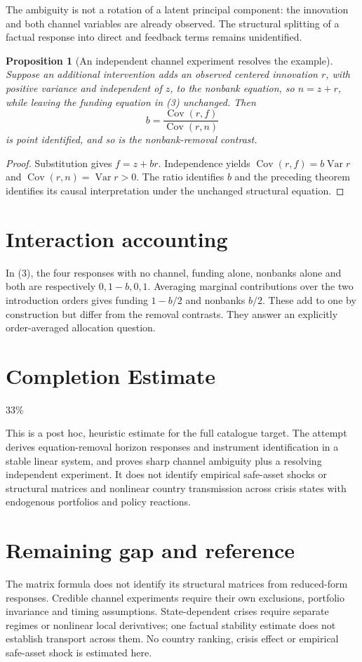 \documentclass[11pt,a4paper]{article}
\newtheorem{proposition}[theorem]{Proposition}
\theoremstyle{definition}
\theoremstyle{remark}
\DeclareMathOperator{\Var}{Var}
\DeclareMathOperator{\Cov}{Cov}
\begin{document}
The ambiguity is not a rotation of a latent principal component: the innovation and both channel variables are already observed. The structural splitting of a factual response into direct and feedback terms remains unidentified.

\begin{proposition}[An independent channel experiment resolves the example]
Suppose an additional intervention adds an observed centered innovation $r$, with positive variance and independent of $z$, to the nonbank equation, so $n=z+r$, while leaving the funding equation in (3) unchanged. Then
\[
 b=\frac{\Cov(r,f)}{\Cov(r,n)}
\]
is point identified, and so is the nonbank-removal contrast.
\end{proposition}
\begin{proof}
Substitution gives $f=z+br$. Independence yields $\Cov(r,f)=b\Var r$ and $\Cov(r,n)=\Var r>0$. The ratio identifies $b$ and the preceding theorem identifies its causal interpretation under the unchanged structural equation.
\end{proof}

\section{Interaction accounting}
In (3), the four responses with no channel, funding alone, nonbanks alone and both are respectively $0,1-b,0,1$. Averaging marginal contributions over the two introduction orders gives funding $1-b/2$ and nonbanks $b/2$. These add to one by construction but differ from the removal contrasts. They answer an explicitly order-averaged allocation question.

\section{Completion Estimate}
33\%

This is a post hoc, heuristic estimate for the full catalogue target.
The attempt derives equation-removal horizon responses and instrument identification in a stable linear system, and proves sharp channel ambiguity plus a resolving independent experiment. It does not identify empirical safe-asset shocks or structural matrices and nonlinear country transmission across crisis states with endogenous portfolios and policy reactions.

\section{Remaining gap and reference}
The matrix formula does not identify its structural matrices from reduced-form responses. Credible channel experiments require their own exclusions, portfolio invariance and timing assumptions. State-dependent crises require separate regimes or nonlinear local derivatives; one factual stability estimate does not establish transport across them. No country ranking, crisis effect or empirical safe-asset shock is estimated here.
\end{document}
